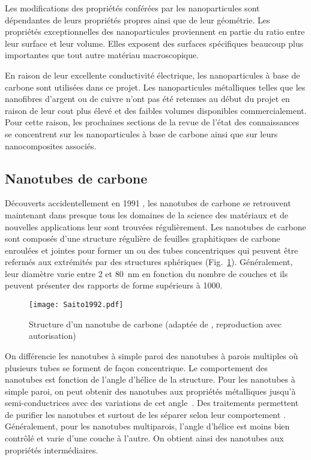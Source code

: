 Les modifications des propriétés conférées par les nanoparticules sont dépendantes de leurs propriétés propres ainsi que de leur géométrie. 
Les propriétés exceptionnelles des nanoparticules proviennent en partie du ratio entre leur surface et leur volume. 
Elles exposent des surfaces spécifiques beaucoup plus importantes que tout autre matériau macroscopique. 

En raison de leur excellente conductivité électrique, les nanoparticules à base de carbone sont utilisées dans ce projet. 
Les nanoparticules métalliques telles que les nanofibres d'argent ou de cuivre n'ont pas été retenues au début du projet en raison de leur cout plus élevé et des faibles volumes disponibles commercialement. 
Pour cette raison, les prochaines sections de la revue de l'état des connaissances se concentrent sur les nanoparticules à base de carbone ainsi que sur leurs nanocomposites associés. 

\subsection{Nanotubes de carbone}

Découverts accidentellement en 1991 \cite{iijima1991}, les nanotubes de carbone se retrouvent maintenant dans presque tous les domaines de la science des matériaux et de nouvelles applications leur sont trouvées régulièrement. 
Les nanotubes de carbone sont composés d'une structure régulière de feuilles graphitiques de carbone enroulées et jointes pour former un ou des tubes concentriques qui peuvent être refermés aux extrémités par des structures sphériques (Fig.~\ref{structure_nanotube}). 
Généralement, leur diamètre varie entre 2 et \SI{80}{\nano\metre} en fonction du nombre de couches et ils peuvent présenter des rapports de forme supérieurs à 1000. 

\begin{figure}[htb]
	\centering
	\texttt{[image: Saito1992.pdf]}
	\caption{Structure d'un nanotube de carbone (adaptée de \cite{Saito1992}, reproduction avec autorisation)}
	\label{structure_nanotube}
\end{figure}

On différencie les nanotubes à simple paroi des nanotubes à parois multiples où plusieurs tubes se forment de façon concentrique. 
Le comportement des nanotubes est fonction de l'angle d'hélice de la structure. 
Pour les nanotubes à simple paroi, on peut obtenir des nanotubes aux propriétés métalliques jusqu'à semi-conductrices avec des variations de cet angle~\cite{Saito1992}. 
Des traitements permettent de purifier les nanotubes et surtout de les séparer selon leur comportement \cite{Makama2013}. 
Généralement, pour les nanotubes multiparois, l'angle d'hélice est moins bien contrôlé et varie d'une couche à l'autre.
On obtient ainsi des nanotubes aux propriétés intermédiaires. 

